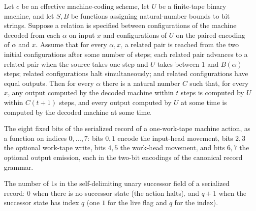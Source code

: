 \begin{lemma}
\label{Turing.universal_from_blocks}
\leanok
{}
Let $c$ be an effective machine-coding scheme, let $U$ be a finite-tape binary machine,
and let $S,B$ be functions assigning natural-number bounds to bit strings. Suppose a
relation is specified between configurations of the machine decoded from each $\alpha$
on input $x$ and configurations of $U$ on the paired encoding of $\alpha$ and $x$.
Assume that for every $\alpha,x$, a related pair is reached from the two initial
configurations after some number of steps; each related pair advances to a related pair
when the source takes one step and $U$ takes between $1$ and $B(\alpha)$ steps; related
configurations halt simultaneously; and related configurations have equal outputs. Then
for every $\alpha$ there is a natural number $C$ such that, for every $x$, any output
computed by the decoded machine within $t$ steps is computed by $U$ within $C(t+1)$
steps, and every output computed by $U$ at some time is computed by the decoded machine
at some time.
\end{lemma}

\begin{definition}
\label{Turing.universalActionBits}
\leanok
{}
The eight fixed bits of the serialized record of a one-work-tape machine
action, as a function on indices $0, \dots, 7$: bits $0, 1$ encode the
input-head movement, bits $2, 3$ the optional work-tape write, bits $4, 5$
the work-head movement, and bits $6, 7$ the optional output emission, each in
the two-bit encodings of the canonical record grammar.
\end{definition}

\begin{definition}
\label{Turing.universalNextOnes}
\leanok
The number of $1$s in the self-delimiting unary successor field of a
serialized record: $0$ when there is no successor state (the action halts),
and $q + 1$ when the successor state has index $q$ (one $1$ for the live flag
and $q$ for the index).
\end{definition}

